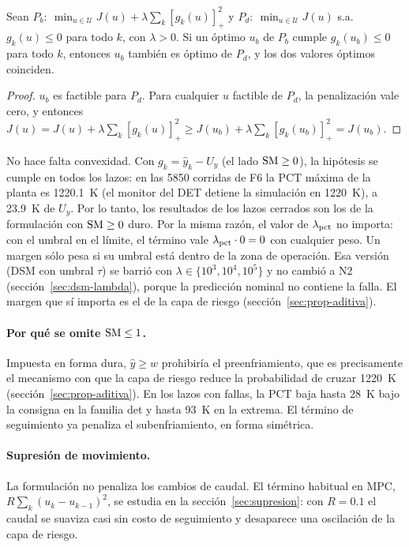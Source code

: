 \begin{proposicion}\label{prop:blanda-dura}
Sean $P_b:\ \min_{u\in\mathcal U}J(u)+\lambda\sum_k[g_k(u)]_+^2$ y
$P_d:\ \min_{u\in\mathcal U}J(u)$ s.a. $g_k(u)\le0$ para todo $k$, con $\lambda>0$. Si un
óptimo $u_b$ de $P_b$ cumple $g_k(u_b)\le0$ para todo $k$, entonces $u_b$ también es óptimo
de $P_d$, y los dos valores óptimos coinciden.
\end{proposicion}
\begin{proof}
$u_b$ es factible para $P_d$. Para cualquier $u$ factible de $P_d$, la penalización vale
cero, y entonces $J(u)=J(u)+\lambda\sum_k[g_k(u)]_+^2\ge J(u_b)+\lambda\sum_k[g_k(u_b)]_+^2=J(u_b)$.
\end{proof}
\noindent No hace falta convexidad. Con $g_k=\hat y_k-U_y$ (el lado ${\rm SM}\ge0$), la
hipótesis se cumple en todos los lazos: en las 5850 corridas de F6 la PCT máxima de la planta
es 1220.1~K (el monitor del DET detiene la simulación en 1220~K), a 23.9~K de $U_y$. Por lo
tanto, los resultados de los lazos cerrados son los de la formulación con ${\rm SM}\ge0$ duro.
Por la misma razón, el valor de $\lambda_{\rm pct}$ no importa: con el umbral en el límite, el
término vale $\lambda_{\rm pct}\cdot0=0$ con cualquier peso. Un margen sólo pesa si su umbral
está dentro de la zona de operación. Esa versión (DSM con umbral $\tau$) se barrió con
$\lambda\in\{10^3,10^4,10^5\}$ y no cambió a N2 (sección~\ref{sec:dsm-lambda}), porque la
predicción nominal no contiene la falla. El margen que sí importa es el de la capa de riesgo
(sección~\ref{sec:prop-aditiva}).

\paragraph{Por qué se omite ${\rm SM}\le1$.} Impuesta en forma dura, $\hat y\ge w$ prohibiría
el preenfriamiento, que es precisamente el mecanismo con que la capa de riesgo reduce la
probabilidad de cruzar 1220~K (sección~\ref{sec:prop-aditiva}). En los lazos con fallas, la
PCT baja hasta 28~K bajo la consigna en la familia det y hasta 93~K en la extrema. El término
de seguimiento ya penaliza el subenfriamiento, en forma simétrica.

\paragraph{Supresión de movimiento.} La formulación no penaliza los cambios de caudal. El
término habitual en MPC, $R\sum_k(u_k-u_{k-1})^2$, se estudia en la
sección~\ref{sec:supresion}: con $R=0.1$ el caudal se suaviza casi sin costo de seguimiento
y desaparece una oscilación de la capa de riesgo.

